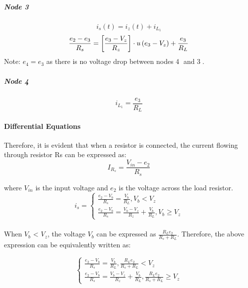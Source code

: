 \subparagraph{Node \textcircled{3}}
\begin{equation}
    i_s(t) = i_z(t) + i_{L_1}
\end{equation}
\begin{equation}
    \frac{e_2-e_3}{R_s}= \left[\frac{e_3 - V_z}{R_z} \right]\cdot u\left(e_3 - V_z \right) +\frac{e_3}{R_L}
\end{equation}
Note: $e_4 = e_3$ as there is no voltage drop between nodes \textcircled{4} and \textcircled{3}.

\subparagraph{Node \textcircled{4}}
\begin{equation}
	i_{L_1} = \frac{e_3}{R_L}
\end{equation}

\pagebreak
\paragraph{Differential Equations}
Therefore, it is evident that when a resistor is connected, the current flowing through resistor Rs can be expressed as:
\begin{equation}
    I_{R_s} = \frac{V_{in} - e_2}{R_s}
\end{equation}


where $V_{in}$ is the input voltage and $e_2$ is the voltage across the load resistor.\\

\begin{equation}
    i_s=\begin{cases}
        \frac{e_2-V_b}{R_s}=\frac{V_b}{R_L},  V_b<V_z\\
        \frac{e_2-V_b}{R_s}=\frac{V_b-V_z}{R_z}+\frac{V_b}{R_L},  V_b \geq V_z
    \end{cases}
\end{equation}\\

When $V_b$ < $V_z$, the voltage $V_b$ can be expressed as $\frac{R_Le_2}{R_s+R_L}$. Therefore, the above expression can be equivalently written as:

\begin{equation}
    \begin{cases}
        \frac{e_2-V_b}{R_s}=\frac{V_b}{R_L}, \frac{R_Le_2}{R_s+R_L}<V_z\\
        \frac{e_2-V_b}{R_s}=\frac{V_b-V_z}{R_z}+\frac{V_b}{R_L}, \frac{R_Le_2}{R_s+R_L} \geq V_z
    \end{cases}
\end{equation}\\

